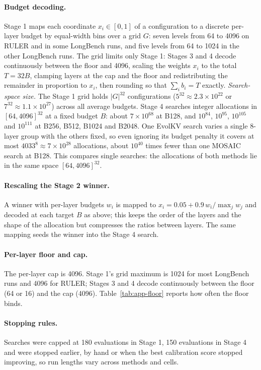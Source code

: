 \paragraph{Budget decoding.} Stage 1 maps each coordinate $x_i \in [0,1]$ of a configuration to a discrete per-layer budget by equal-width bins over a grid $G$: seven levels from 64 to 4096 on RULER and in some LongBench runs, and five levels from 64 to 1024 in the other LongBench runs. The grid limits only Stage 1: Stages 3 and 4 decode continuously between the floor and 4096, scaling the weights $x_i$ to the total $T = 32B$, clamping layers at the cap and the floor and redistributing the remainder in proportion to $x_i$, then rounding so that $\sum_i b_i = T$ exactly. \emph{Search-space size.} The Stage 1 grid holds $|G|^{32}$ configurations ($5^{32} \approx 2.3\times10^{22}$ or $7^{32} \approx 1.1\times10^{27}$) across all average budgets. Stage 4 searches integer allocations in $[64, 4096]^{32}$ at a fixed budget $B$: about $7\times10^{68}$ at B128, and $10^{84}$, $10^{95}$, $10^{105}$ and $10^{111}$ at B256, B512, B1024 and B2048. One EvolKV search varies a single 8-layer group with the others fixed, so even ignoring its budget penalty it covers at most $4033^8 \approx 7\times10^{28}$ allocations, about $10^{40}$ times fewer than one MOSAIC search at B128. This compares single searches: the allocations of both methods lie in the same space $[64, 4096]^{32}$.

\paragraph{Rescaling the Stage 2 winner.} A winner with per-layer budgets $w_i$ is mapped to $x_i = 0.05 + 0.9\,w_i / \max_j w_j$ and decoded at each target $B$ as above; this keeps the order of the layers and the shape of the allocation but compresses the ratios between layers. The same mapping seeds the winner into the Stage 4 search.

\paragraph{Per-layer floor and cap.} The per-layer cap is 4096. Stage 1's grid maximum is 1024 for most LongBench runs and 4096 for RULER; Stages 3 and 4 decode continuously between the floor (64 or 16) and the cap (4096). Table~\ref{tab:app-floor} reports how often the floor binds.

\paragraph{Stopping rules.} Searches were capped at 180  evaluations in Stage 1, 150 evaluations in Stage 4 and were stopped earlier, by hand or when the best calibration score stopped improving, so run lengths vary across methods and cells.

